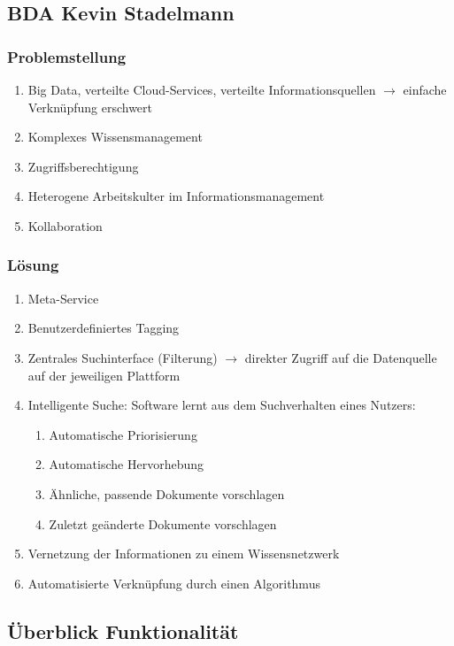 \subsection{BDA Kevin Stadelmann}

\subsubsection{Problemstellung}

\begin{enumerate}
    \item Big Data, verteilte Cloud-Services, verteilte Informationsquellen $\rightarrow$ einfache Verknüpfung erschwert
    \item Komplexes Wissensmanagement
    \item Zugriffsberechtigung
    \item Heterogene Arbeitskulter im Informationsmanagement
    \item Kollaboration
\end{enumerate}

\subsubsection{Lösung}

\begin{enumerate}
    \item Meta-Service
    \item Benutzerdefiniertes Tagging
    \item Zentrales Suchinterface (Filterung) $\rightarrow$ direkter Zugriff auf die Datenquelle auf der jeweiligen Plattform
    \item Intelligente Suche: Software lernt aus dem Suchverhalten eines Nutzers:
    \begin{enumerate}
        \item Automatische Priorisierung
        \item Automatische Hervorhebung
        \item Ähnliche, passende Dokumente vorschlagen
        \item Zuletzt geänderte Dokumente vorschlagen
    \end{enumerate}
    \item Vernetzung der Informationen zu einem Wissensnetzwerk
    \item Automatisierte Verknüpfung durch einen Algorithmus
\end{enumerate}

\subsection{Überblick Funktionalität}


